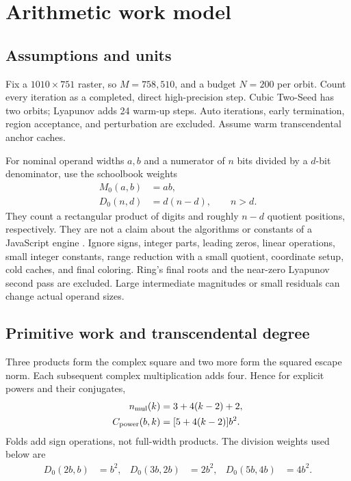\documentclass[11pt,a4paper]{article}
\numberwithin{equation}{section}
\begin{document}
\section{Arithmetic work model}\label{sec:cost}

\subsection{Assumptions and units}

Fix a \(1010\times751\) raster, so \(M=758{,}510\), and a budget
\(N=200\) per orbit. Count every iteration as a completed, direct
high-precision step. Cubic Two-Seed has two orbits; Lyapunov adds
24 warm-up steps. Auto iterations, early termination, region acceptance,
and perturbation are excluded. Assume warm transcendental anchor
caches.

For nominal operand widths \(a,b\) and a numerator of \(n\) bits
divided by a \(d\)-bit denominator, use the schoolbook weights
\begin{align}
  M_0(a,b)&=ab,\\
  D_0(n,d)&=d(n-d),\qquad n>d.
\end{align}
They count a rectangular product of digits and roughly \(n-d\)
quotient positions, respectively. They are not a claim about the
algorithms or constants of a JavaScript engine \cite{brent}. Ignore
signs, integer parts, leading zeros, linear operations, small integer
constants, range reduction with a small quotient, coordinate setup,
cold caches, and final coloring. Ring's final roots and the near-zero
Lyapunov second pass are excluded. Large intermediate magnitudes or
small residuals can change actual operand sizes.

\subsection{Primitive work and transcendental degree}

Three products form the complex square and two more form the squared
escape norm. Each subsequent complex multiplication adds four.
Hence for explicit powers and their conjugates,
\begin{align}
  n_{\rm mul}(k)&=3+4(k-2)+2,\\
  C_{\rm power}(b,k)&=[5+4(k-2)]b^2.
\end{align}
Folds add sign operations, not full-width products. The division
weights used below are
\begin{align*}
  D_0(2b,b)&=b^2, & D_0(3b,2b)&=2b^2, & D_0(5b,4b)&=4b^2 .
\end{align*}
\end{document}
